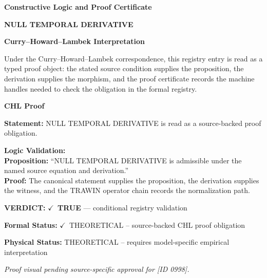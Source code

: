 \clearpage
\begingroup\tzpsupportsetup
\noindent\textbf{\fontsize{10.8pt}{12.8pt}\selectfont [ID 0998] Constructive Logic and Proof Certificate}\par
\noindent\textbf{\fontsize{10pt}{12pt}\selectfont NULL TEMPORAL DERIVATIVE}\par
\vspace{0.45em}
\begingroup
\footnotesize
\setlength{\parskip}{0.22em}
\setlength{\parindent}{0pt}
\noindent\textbf{Curry--Howard--Lambek Interpretation}\par
Under the Curry--Howard--Lambek correspondence, this registry entry is read as a typed proof
object: the stated source condition supplies the proposition, the derivation supplies the
morphism, and the proof certificate records the machine handles needed to check the obligation
in the formal registry.

\vspace{0.45em}
\noindent\textbf{CHL Proof}\par
\textbf{Statement:} NULL TEMPORAL DERIVATIVE is read as a source-backed proof obligation.

\textbf{Logic Validation:}\\
\textbf{Proposition:} ``NULL TEMPORAL DERIVATIVE is admissible under the named source equation and derivation.''\\
\textbf{Proof:} The canonical statement supplies the proposition, the derivation supplies the witness, and the TRAWIN operator chain records the normalization path.

\textbf{VERDICT:} \ensuremath{\checkmark}\ \textbf{TRUE} --- conditional registry validation

\textbf{Formal Status:} \ensuremath{\checkmark}\ THEORETICAL -- source-backed CHL proof obligation

\textbf{Physical Status:} THEORETICAL -- requires model-specific empirical interpretation
\par\vspace{0.45em}
\par
\vfill
\begingroup\footnotesize\itshape
Proof visual pending source-specific approval for [ID 0998].
\par\endgroup
\vfill
\endgroup
\endgroup
